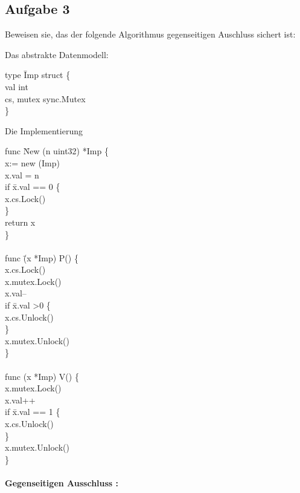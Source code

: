 \subsection*{Aufgabe 3}

Beweisen sie, das der folgende Algorithmus gegenseitigen Auschluss sichert ist:

Das abstrakte Datenmodell:
\begin{tabbing}
type \= Imp struct \{ \\
\>	val int \\
\>	cs, mutex sync.Mutex \\
\} \\
\end{tabbing}

Die Implementierung

\begin{tabbing}
func \= New (n uint32) *Imp \{ \\
\>	x:= new (Imp) \\
\>	x.val = n \\
\>	if \= x.val == 0 \{ \\
\>	\>	x.cs.Lock() \\ 
\>	\} \\
\>	return x \\
\} \\
\\
func \= (x *Imp) P() \{ \\
\>	x.cs.Lock() \\
\>	x.mutex.Lock() \\
\>	x.val-- \\
\>	if \= x.val \textgreater 0 \{ \\
\>	\>	x.cs.Unlock() \\
\>	\} \\
\>	x.mutex.Unlock() \\
\} \\
\\
func (x *Imp) V() \{ \\
\>	x.mutex.Lock() \\
\>	x.val++ \\
\>	if \= x.val == 1 \{ \\
\>	\>	x.cs.Unlock() \\
\>	\} \\
\>	x.mutex.Unlock() \\
\} \\
\end{tabbing}


\paragraph*{ Gegenseitigen Ausschluss : }

